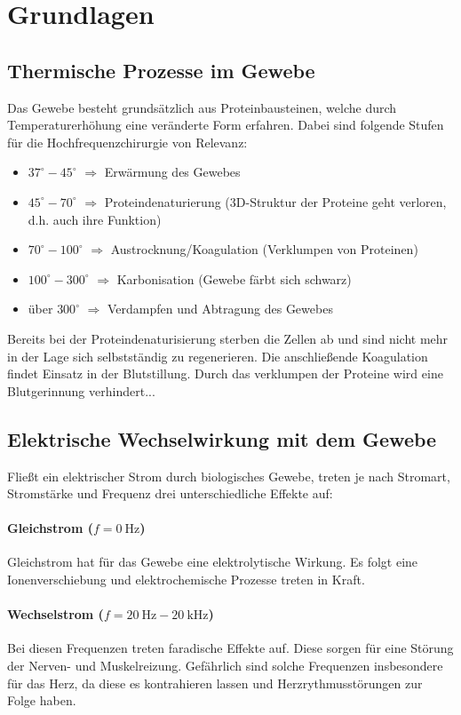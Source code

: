 \documentclass[letterpaper,12pt]{article}
\begin{document}
	
	\newpage
	\section{Grundlagen}
	
		\subsection{Thermische Prozesse im Gewebe}
		
		Das Gewebe besteht grundsätzlich aus Proteinbausteinen, welche durch Temperaturerhöhung eine veränderte Form erfahren. Dabei sind folgende Stufen für die Hochfrequenzchirurgie von Relevanz:
		\begin{itemize}
			\item $37^\circ-45^\circ$ $\Rightarrow$ Erwärmung des Gewebes
			\item $45^\circ-70^\circ$ $\Rightarrow$ Proteindenaturierung (3D-Struktur der Proteine geht verloren, d.h. auch ihre Funktion)
			\item $70^\circ-100^\circ$ $\Rightarrow$ Austrocknung/Koagulation (Verklumpen von Proteinen)
			\item $100^\circ-300^\circ$ $\Rightarrow$ Karbonisation (Gewebe färbt sich schwarz)
			\item über $300^\circ$ $\Rightarrow$ Verdampfen und Abtragung des Gewebes
		\end{itemize}
		Bereits bei der Proteindenaturisierung sterben die Zellen ab und sind nicht mehr in der Lage sich selbstständig zu regenerieren. Die anschließende Koagulation findet Einsatz in der Blutstillung. Durch das verklumpen der Proteine wird eine Blutgerinnung verhindert...
	
		\subsection{Elektrische Wechselwirkung mit dem Gewebe}
	
			Fließt ein elektrischer Strom durch biologisches Gewebe, treten je nach Stromart, Stromstärke und Frequenz drei unterschiedliche Effekte auf:
			\paragraph{Gleichstrom ($f=\SI{0}{\hertz}$)}
			Gleichstrom hat für das Gewebe eine elektrolytische Wirkung. Es folgt eine Ionenverschiebung und elektrochemische Prozesse treten in Kraft. 
			\paragraph{Wechselstrom ($f=\SI{20}{\hertz}-\SI{20}{\kilo\hertz}$)}
			Bei diesen Frequenzen treten faradische Effekte auf. Diese sorgen für eine Störung der Nerven- und Muskelreizung. Gefährlich sind solche Frequenzen insbesondere für das Herz, da diese es kontrahieren lassen und Herzrythmusstörungen zur Folge haben.
\end{document}

